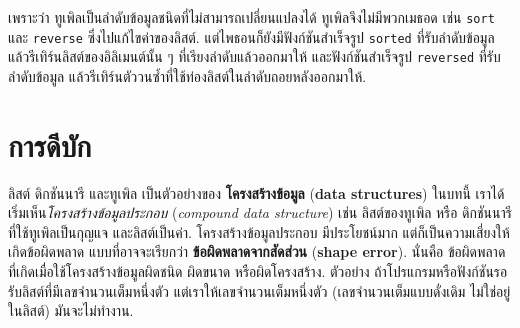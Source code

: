 เพราะว่า ทูเพิลเป็นลำดับข้อมูลชนิดที่ไม่สามารถเปลี่ยนแปลงได้
ทูเพิลจึงไม่มีพวกเมธอด เช่น \texttt{sort} และ \texttt{reverse}
ซึ่งไปแก้ไขค่าของลิสต์.
แต่ไพธอนก็ยังมีฟังก์ชันสำเร็จรูป \texttt{sorted} 
ที่รับลำดับข้อมูล แล้วรีเทิร์นลิสต์ของอิลิเมนต์นั้น ๆ ที่เรียงลำดับแล้วออกมาให้
และฟังก์ชันสำเร็จรูป \texttt{reversed} ที่รับลำดับข้อมูล แล้วรีเทิร์นตัววนซ้ำที่ใช้ท่องลิสต์ในลำดับถอยหลังออกมาให้.
%
 

\section{การดีบัก}


ลิสต์ ดิกชันนารี และทูเพิล เป็นตัวอย่างของ \textbf{โครงสร้างข้อมูล} (\textbf{data structures})
ในบทนี้ เราได้เริ่มเห็น\textit{โครงสร้างข้อมูลประกอบ} (\textit{compound data structure})
เช่น ลิสต์ของทูเพิล หรือ ดิกชันนารีที่ใช้ทูเพิลเป็นกุญแจ และลิสต์เป็นค่า.
โครงสร้างข้อมูลประกอบ มีประโยชน์มาก
แต่ก็เป็นความเสี่ยงให้เกิดข้อผิดพลาด แบบที่อาจจะเรียกว่า \textbf{ข้อผิดพลาดจากสัดส่วน} (\textbf{shape error}).
นั่นคือ ข้อผิดพลาด ที่เกิดเมื่อใช้โครงสร้างข้อมูลผิดชนิด ผิดขนาด หรือผิดโครงสร้าง.
ตัวอย่าง 
ถ้าโปรแกรมหรือฟังก์ชันรอรับลิสต์ที่มีเลขจำนวนเต็มหนึ่งตัว 
แต่เราให้เลขจำนวนเต็มหนึ่งตัว (เลขจำนวนเต็มแบบดั่งเดิม ไม่ใช่อยู่ในลิสต์)
มันจะไม่ทำงาน.
%



